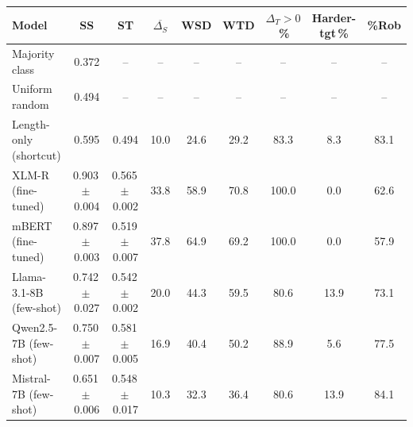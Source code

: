 \begin{tabular}{lcccccccc}
\toprule
Model & SS & ST & $\overline{\Delta_S}$ & WSD & WTD & $\Delta_T{>}0$\,\% & Harder-tgt\,\% & \%Rob \\
\midrule
Majority class & 0.372 & -- & -- & -- & -- & -- & -- & -- \\
Uniform random & 0.494 & -- & -- & -- & -- & -- & -- & -- \\
Length-only (shortcut) & 0.595 & 0.494 & 10.0 & 24.6 & 29.2 & 83.3 & 8.3 & 83.1 \\
\midrule
XLM-R (fine-tuned) & 0.903\,$\pm$\,0.004 & 0.565\,$\pm$\,0.002 & 33.8 & 58.9 & 70.8 & 100.0 & 0.0 & 62.6 \\
mBERT (fine-tuned) & 0.897\,$\pm$\,0.003 & 0.519\,$\pm$\,0.007 & 37.8 & 64.9 & 69.2 & 100.0 & 0.0 & 57.9 \\
\midrule
Llama-3.1-8B (few-shot) & 0.742\,$\pm$\,0.027 & 0.542\,$\pm$\,0.002 & 20.0 & 44.3 & 59.5 & 80.6 & 13.9 & 73.1 \\
Qwen2.5-7B (few-shot) & 0.750\,$\pm$\,0.007 & 0.581\,$\pm$\,0.005 & 16.9 & 40.4 & 50.2 & 88.9 & 5.6 & 77.5 \\
Mistral-7B (few-shot) & 0.651\,$\pm$\,0.006 & 0.548\,$\pm$\,0.017 & 10.3 & 32.3 & 36.4 & 80.6 & 13.9 & 84.1 \\
\bottomrule
\end{tabular}
